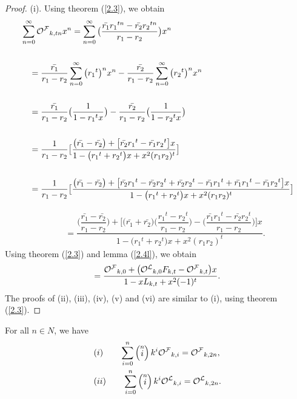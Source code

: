 \begin{proof}(i).
Using theorem (\ref{2.3}), we obtain
\begin{align*}
&\sum\limits_{n=0}^{\infty}{{\mathcal{O^F}}}_{k,tn}x^n= \sum\limits_{n=0}^{\infty}\big(\frac{\bar{r_1}{{r_1}}^{tn}-\bar{r_2}{r_{2}}^{tn}}{r_1-r_2}\big)x^n\\
\\&\quad =\frac{\bar{r_1}}{r_1-r_2}\sum\limits_{n=0}^{\infty}\big({r_1}^t\big)^nx^n-\frac{\bar{r_2}}{r_1-r_2}\sum\limits_{n=0}^{\infty}\big({r_2}^t\big)^nx^n\\
\\&\quad =\frac{\bar{r_1}}{r_1-r_2}\big(\frac{1}{1-{r_1}^tx}\big)-\frac{\bar{r_2}}{r_1-r_2}\big(\frac{1}{1-{r_2}^tx}\big)\\
\\&\quad =\frac{1}{r_1-r_2}\big[\frac{\big(\bar{r_1}-\bar{r_2}\big)+\big[\bar{r_2}{r_1}^t-\bar{r_1}{r_2}^t\big]x}{1-\big({r_1}^t+{r_2}^t\big)x+x^2(r_1r_2)^t}\big]\\
\\&\quad =\frac{1}{r_1-r_2}\big[\frac{\big(\bar{r_1}-\bar{r_2}\big)+\big[\bar{r_2}{r_1}^t-\bar{r_2}{r_2}^t+\bar{r_2}{r_2}^t-\bar{r_1}{r_1}^t+\bar{r_1}{r_1}^t-\bar{r_1}{r_2}^t\big]x}{1-\big({r_1}^t+{r_2}^t\big)x+x^2(r_1r_2)^t}\big]\\
\end{align*}
\begin{align*}
\\&\quad =\dfrac{\big(\dfrac{\bar{r_1}-\bar{r_2}}{r_1-r_2}\big)+\big[\big(\bar{r_1}+\bar{r_2}\big)\big(\dfrac{{r_1}^t-{r_2}^t}{r_1-r_2}\big)-\big(\dfrac{\bar{r_1}{r_1}^t-\bar{r_2}{r_2}^t}{r_1-r_2}\big)\big]x}{1-\big({r_1}^t+{r_2}^t\big)x+x^2(r_1r_2)^t}.
\end{align*}
Using theorem (\ref{2.3}) and lemma (\ref{2.4l}), we obtain
\begin{align*}
=\dfrac{{{\mathcal{O^F}}}_{k,0}+\big({{\mathcal{O^L}}}_{k,0}F_{k,t}-{{\mathcal{O^F}}}_{k,t}\big)x}{1-xL_{k,t}+x^2(-1)^t}.
\end{align*}
The proofs of (ii), (iii), (iv), (v) and (vi) are similar to (i), using theorem (\ref{2.3}).
\end{proof}
\begin{theorem}
For all $n\in N$, we have\label{2.7t}
\begin{align*}
&(i)\qquad\sum\limits_{i=0}^{n}\left( \stackrel{n}{i}\right) k^{i}{{\mathcal{O^F}}}_{k,i}={{\mathcal{O^F}}}_{k,2n},\\
&(ii)\qquad\sum\limits_{i=0}^{n}\left( \stackrel{n}{i}\right) k^{i}{{\mathcal{O^L}}}_{k,i}={{\mathcal{O^L}}}_{k,2n}.
\end{align*}
\end{theorem}
